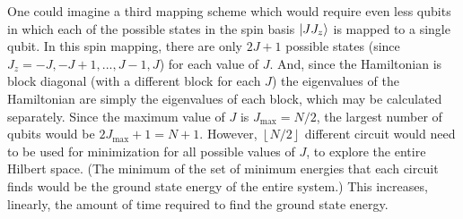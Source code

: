 \documentclass[10pt]{article}
\begin{document}
One could imagine a third mapping scheme which would require even less qubits in which each of the possible states in the spin basis $\ket{JJ_z}$ is mapped to a single qubit. In this spin mapping, there are only $2J+1$ possible states (since $J_z=-J,-J+1,...,J-1,J$) for each value of $J$. And, since the Hamiltonian is block diagonal (with a different block for each $J$) the eigenvalues of the Hamiltonian are simply the eigenvalues of each block, which may be calculated separately. Since the maximum value of $J$ is $J_{\text{max}}=N/2$, the largest number of qubits would be $2J_{\text{max}}+1=N+1$. However, $\left\lfloor N/2 \right\rfloor$ different circuit would need to be used for minimization for all possible values of $J$, to explore the entire Hilbert space. (The minimum of the set of minimum energies that each circuit finds would be the ground state energy of the entire system.) This increases, linearly, the amount of time required to find the ground state energy.
\end{document}
